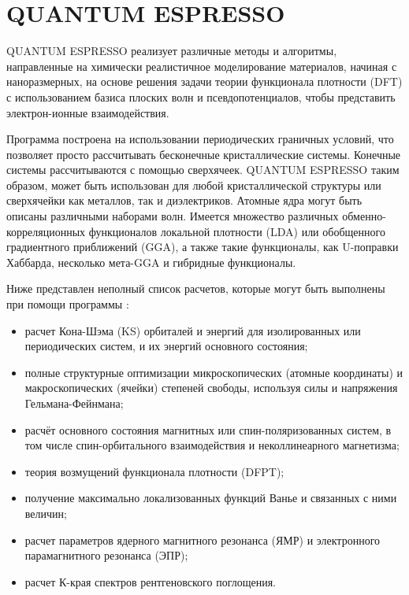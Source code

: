 \section{QUANTUM ESPRESSO}
QUANTUM ESPRESSO реализует различные методы и алгоритмы, направленные на химически реалистичное моделирование материалов, начиная с наноразмерных, на основе решения задачи теории функционала плотности (DFT) с использованием базиса плоских волн и псевдопотенциалов, чтобы представить электрон-ионные взаимодействия.

Программа построена на использовании периодических граничных условий, что позволяет просто рассчитывать бесконечные кристаллические системы. Конечные системы рассчитываются с помощью сверхячеек. QUANTUM ESPRESSO таким образом, может быть использован для любой кристаллической структуры или сверхячейки как металлов, так и диэлектриков. Атомные ядра могут быть описаны различными наборами волн. Имеется множество различных обменно-корреляционных функционалов локальной плотности (LDA) или обобщенного градиентного приближений (GGA), а также такие функционалы, как U-поправки Хаббарда, несколько мета-GGA и гибридные функционалы.

Ниже представлен неполный список расчетов, которые могут быть выполнены при помощи программы \cite{qe}:
\begin{itemize}
    \item расчет Кона-Шэма (KS) орбиталей и энергий для изолированных или периодических систем, и их энергий основного состояния;
    \item полные структурные оптимизации микроскопических (атомные координаты) и макроскопических (ячейки) степеней свободы, используя силы и напряжения Гельмана-Фейнмана;
    \item расчёт основного состояния магнитных или спин-поляризованных систем, в том числе спин-орбитального взаимодействия и неколлинеарного магнетизма;
    \item теория возмущений функционала плотности (DFPT);
    \item получение максимально локализованных функций Ванье и связанных с ними величин;
    \item расчет параметров ядерного магнитного резонанса (ЯМР) и электронного парамагнитного резонанса (ЭПР);
    \item расчет К-края спектров рентгеновского поглощения.
\end{itemize}
